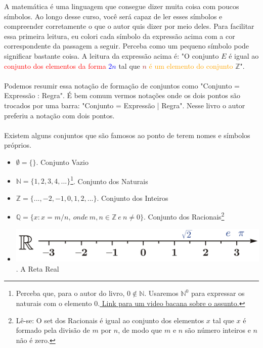 \documentclass[main.tex]{subfiles}
\begin{document}
A matemática é uma linguagem que consegue dizer muita coisa com poucos símbolos. Ao longo desse curso, você será capaz de ler esses símbolos e compreender corretamente o que o autor quis dizer por meio deles. Para facilitar essa primeira leitura, eu colori cada símbolo da expressão acima com a cor correspondente da passagem a seguir. Perceba como um pequeno símbolo pode significar bastante coisa. A leitura da expressão acima é: "O conjunto $E$ é igual ao \textcolor{red}{conjunto dos elementos da forma} \textcolor{blue}{$2n$} \textcolor{OliveGreen}{tal que} \textcolor{Brown}{$n$} \textcolor{Orange}{é um elemento do conjunto} $\mathbb{Z}$".
\\~\\
Podemos resumir essa notação de formação de conjuntos como "Conjunto = {Expressão : Regra}". É bem comum vermos notações onde os dois pontos são trocados por uma barra: "Conjunto = {Expressão | Regra}". Nesse livro o autor preferiu a notação com dois pontos.
\\~\\
Existem alguns conjuntos que são famosos ao ponto de terem nomes e símbolos próprios.
\begin{itemize}
	\item[] $\emptyset = \{ \}$. Conjunto Vazio
	\item[] $\mathbb{N} = \{ 1, 2, 3, 4, ... \}$\footnote{Perceba que, para o autor do livro, $0 \notin \mathbb{N}$. Usaremos $\mathbb{N}^0$ para expressar os naturais com o elemento 0.\href{https://www.youtube.com/watch?v=j9WmXliT0lM}{ Link para um video bacana sobre o assunto.}}. Conjunto dos Naturais
	\item[] $\mathbb{Z} = \{ ..., -2, -1, 0, 1, 2, ...  \}$. Conjunto dos Inteiros
	\item[] $\mathbb{Q} = \{ x : x = m/n, \ onde \ m,n \in \mathbb{Z} \  e \  n \neq 0 \}$. Conjunto dos Racionais\footnote{Lê-se: O set dos Racionais é igual ao conjunto dos elementos $x$ tal que $x$ é formado pela divisão de $m$ por $n$, de modo que $m$ e $n$ são número inteiros e $n$ não é zero.}
	\item[] \includegraphics[scale=0.11]{images/real_line.png}. A Reta Real
\end{itemize}
\end{document}
